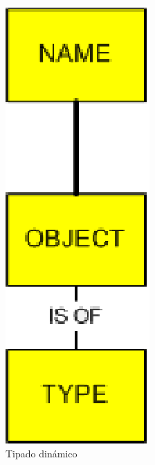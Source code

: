 \documentclass[12pt,legalpaper]{report}
\begin{document}
\begin{figure}[hpb]
	\centering
	\includegraphics[scale=0.5]{images/JavaPython/dynamicTyping.eps}
	\caption{Tipado dinámico}
\end{figure}
\end{document}
